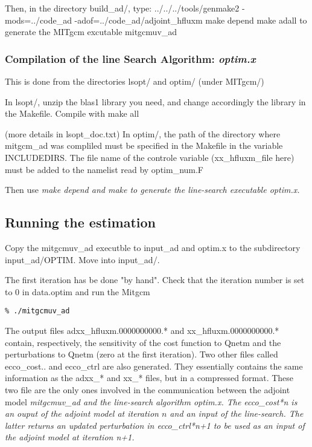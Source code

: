 Then, in the directory build\_ad/, type:
../../../tools/genmake2 -mods=../code\_ad -adof=../code\_ad/adjoint\_hfluxm
make depend
make adall
to generate the MITgcm excutable mitgcmuv\_ad


\subsubsection{Compilation of the line Search Algorithm: \it{optim.x}}

This is done from the directories lsopt/ and optim/ (under MITgcm/)

In lsopt/, unzip the blas1 library you need, and change accordingly the
library in the Makefile. Compile with make all

(more details in lsopt\_doc.txt)
In optim/,  the path of the directory where mitgcm\_ad was compliled must be specified
in the Makefile in the variable INCLUDEDIRS. The file name of the controle variable
(xx\_hfluxm\_file here) must be added to the namelist read by optim\_num.F

Then use \it{make depend} and \it{make} to generate the line-search executable \it{optim.x}.

\subsection{Running the estimation}

Copy the mitgcmuv\_ad executble to input\_ad and optim.x to the subdirectory
input\_ad/OPTIM. Move into input\_ad/.

The first iteration has be done "by hand". Check that the iteration number is set
to 0 in data.optim and run the Mitgcm
\begin{verbatim}
% ./mitgcmuv_ad
\end{verbatim}

The output files adxx\_hfluxm.0000000000.* and xx\_hfluxm.0000000000.* contain,
respectively, the sensitivity of the cost function to Qnetm and the perturbations
to Qnetm (zero at the first iteration). Two other files called ecco\_cost.. and
ecco\_ctrl are also generated. They essentially contains the same information as the
adxx\_* and xx\_* files, but in a compressed format. These two file are the only ones
involved in the communication between the adjoint model \it{mitgcmuv\_ad} and the
line-search algorithm \it{optim.x}. The ecco\_cost*n is an ouput of the adjoint model
at iteration $n$ and an input of the line-search. The latter returns an updated
perturbation in ecco\_ctrl*n+1 to be used as an input of the adjoint model at iteration n+1. 

